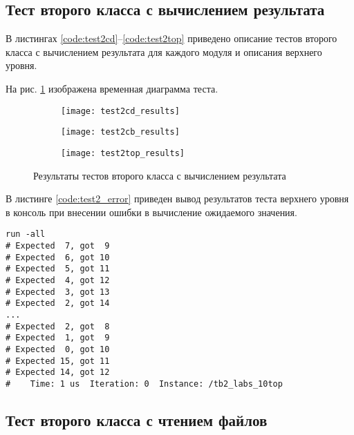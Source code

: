 \subsection{Тест второго класса с вычислением результата}

В листингах \ref{code:test2cd}--\ref{code:test2top} приведено описание тестов второго класса с вычислением результата для каждого модуля и описания верхнего уровня.




На рис. \ref{fig:test2_results} изображена временная диаграмма теста.
\vspace{-0.5cm}
\begin{figure}[H]
	\begin{subfigure}{\textwidth}
		\centering
		\texttt{[image: test2cd\_results]}
		\vspace{0.1cm}
	\end{subfigure}
	\begin{subfigure}{\textwidth}
		\centering
		\texttt{[image: test2cb\_results]}
		\vspace{0.1cm}
	\end{subfigure}
	\begin{subfigure}{\textwidth}
		\centering
		\texttt{[image: test2top\_results]}
	\end{subfigure}
	\caption{Результаты тестов второго класса с вычислением результата}
	\label{fig:test2_results}
\end{figure}

В листинге \ref{code:test2_error} приведен вывод результатов теста верхнего уровня в консоль при внесении ошибки в вычисление ожидаемого значения.	
\begin{lstlisting}[caption=Результаты ошибочного теста второго класса с вычислением результата, label=code:test2_error, style=console]
run -all
# Expected  7, got  9
# Expected  6, got 10
# Expected  5, got 11
# Expected  4, got 12
# Expected  3, got 13
# Expected  2, got 14
...
# Expected  2, got  8
# Expected  1, got  9
# Expected  0, got 10
# Expected 15, got 11
# Expected 14, got 12
#    Time: 1 us  Iteration: 0  Instance: /tb2_labs_10top
\end{lstlisting}

\subsection{Тест второго класса с чтением файлов}

